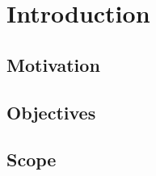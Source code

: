 
\chapter{Introduction}
\label{chap:01-introduction}
\thispagestyle{empty}


\section{Motivation}


\section{Objectives}


\section{Scope}


